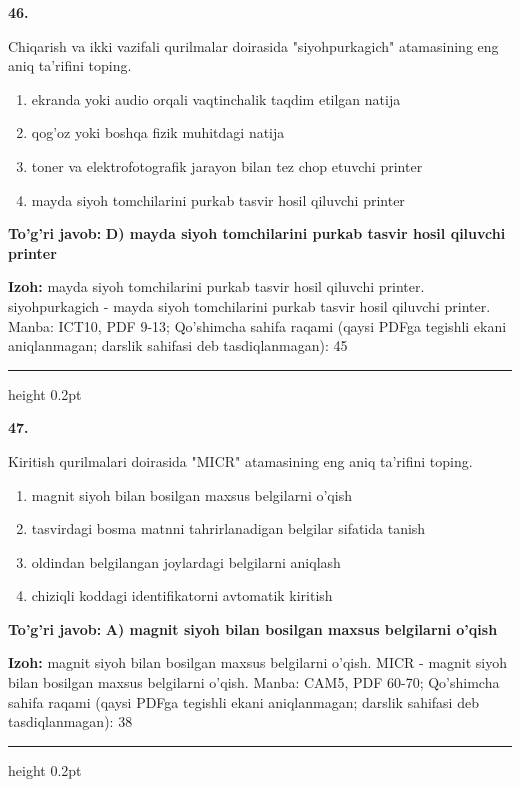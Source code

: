 \documentclass[10pt,a4paper]{article}
\begin{document}
{\bfseries\sffamily\color{ink} 46.}
\par
Chiqarish va ikki vazifali qurilmalar doirasida "siyohpurkagich" atamasining eng aniq ta'rifini toping.
\begin{enumerate}[label=\Alph*),leftmargin=9mm]
\item ekranda yoki audio orqali vaqtinchalik taqdim etilgan natija
\item qog'oz yoki boshqa fizik muhitdagi natija
\item toner va elektrofotografik jarayon bilan tez chop etuvchi printer
\item mayda siyoh tomchilarini purkab tasvir hosil qiluvchi printer
\end{enumerate}
\begin{tcolorbox}[enhanced,breakable,colback=teal!4,colframe=teal!60!black,boxrule=0.45pt,arc=1.2mm,left=2.7mm,right=2.7mm,top=1.8mm,bottom=1.8mm,before skip=2mm,after skip=2mm]
{\bfseries\sffamily\color{teal}To'g'ri javob:} \textbf{D) mayda siyoh tomchilarini purkab tasvir hosil qiluvchi printer}
\par\smallskip
{\bfseries Izoh:} mayda siyoh tomchilarini purkab tasvir hosil qiluvchi printer. siyohpurkagich - mayda siyoh tomchilarini purkab tasvir hosil qiluvchi printer. Manba: ICT10, PDF 9-13; Qo'shimcha sahifa raqami (qaysi PDFga tegishli ekani aniqlanmagan; darslik sahifasi deb tasdiqlanmagan): 45
\end{tcolorbox}
\vspace{2mm}\hrule height 0.2pt\vspace{3mm}

{\bfseries\sffamily\color{ink} 47.}
\par
Kiritish qurilmalari doirasida "MICR" atamasining eng aniq ta'rifini toping.
\begin{enumerate}[label=\Alph*),leftmargin=9mm]
\item magnit siyoh bilan bosilgan maxsus belgilarni o'qish
\item tasvirdagi bosma matnni tahrirlanadigan belgilar sifatida tanish
\item oldindan belgilangan joylardagi belgilarni aniqlash
\item chiziqli koddagi identifikatorni avtomatik kiritish
\end{enumerate}
\begin{tcolorbox}[enhanced,breakable,colback=teal!4,colframe=teal!60!black,boxrule=0.45pt,arc=1.2mm,left=2.7mm,right=2.7mm,top=1.8mm,bottom=1.8mm,before skip=2mm,after skip=2mm]
{\bfseries\sffamily\color{teal}To'g'ri javob:} \textbf{A) magnit siyoh bilan bosilgan maxsus belgilarni o'qish}
\par\smallskip
{\bfseries Izoh:} magnit siyoh bilan bosilgan maxsus belgilarni o'qish. MICR - magnit siyoh bilan bosilgan maxsus belgilarni o'qish. Manba: CAM5, PDF 60-70; Qo'shimcha sahifa raqami (qaysi PDFga tegishli ekani aniqlanmagan; darslik sahifasi deb tasdiqlanmagan): 38
\end{tcolorbox}
\vspace{2mm}\hrule height 0.2pt\vspace{3mm}
\end{document}
